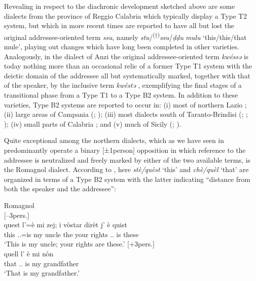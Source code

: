 \documentclass[output=paper]{langsci/langscibook}
\begin{document}
Revealing in respect to the diachronic development sketched above are some
dialects from the province of Reggio Calabria which typically display a Type T2
system, but which in more recent times are reported
\citep[129]{Loporcaro:2009a} to have all but lost the original
addressee-oriented term \emph{ssu}, namely
\emph{stu}/\textsuperscript{(†)}\emph{ssu}/\emph{ḍḍu} \emph{mulu}
‘this/this/that mule’, playing out changes which have long been completed in
other varieties. Analogously, in the dialect of Anzi the original
addressee-oriented term \emph{kwéssə} is today nothing more than an occasional
relic of a former Type T1 system with the deictic domain of the addressee all
but systematically marked, together with that of the speaker, by the inclusive
term \emph{kwéstə} \citep[50]{Ruggieri:1992a}, exemplifying the final stages of
a transitional phase from a Type T1 to a Type B2 system. In addition to
these varieties, Type B2 systems are reported to occur in: (i) most of
northern Lazio \citep[140]{Stavinschi:2009a}; (ii) large areas of Campania
(\citealt[74]{Parascandola:1976a}; \citealt[79, 81f]{Castagna:1982a}); (iii)
most dialects south of Taranto-Brindisi (\citealt[16, 36]{Mancarella:1975a};
\citealt[159]{Mancarella:1998a}; \citealt[129f]{Loporcaro:2009a}); (iv) small
parts of Calabria \citep[33]{Tassone:2000a}; and (v) much of Sicily
(\citealt[722]{Varvaro:1988a}; \citealt[92]{ledgeway2004sviluppo}).

Quite exceptional among the northern  dialects, which as we have seen in
 predominantly operate a binary
[±1person] opposition in which reference to the addressee is neutralized and
freely marked by either of the two available terms, is the Romagnol dialect.
According to \citet[64f]{Masotti:1999a}, here \emph{stè/quèst} ‘this’ and
\emph{chè/quèl} ‘that’ are organized in terms of a Type B2 system with
the latter indicating \enquote{distance from both the speaker and the
addressee}:

\ea Romagnol \citep{Masotti:1999a}\\
    \ea {}[--3pers.]\\
    \gll    quest  l’=è  mi  zej;  i  vòstar  dirèt  j’  è  quist \\
            this \Sbj.\Cl.\Tsg{}=is  my  uncle  the  your  rights  \Sbj.\Cl.\Tpl{} is  these\\
    \glt    \enquote*{This is my uncle; your rights are these.}
    \ex {}[+3pers.]\\
    \gll    quell  l’ è  mi  nòn\\
            that  \Sbj.\Cl.\Tsg{}  is  my  grandfather\\
    \glt    \enquote*{That is my grandfather.}
    \z
\z
\end{document}
